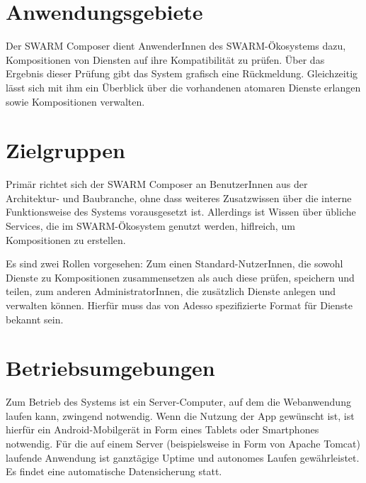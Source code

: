\section*{Anwendungsgebiete}
Der SWARM Composer dient AnwenderInnen des SWARM-Ökosystems dazu, Kompositionen von Diensten auf ihre Kompatibilität zu prüfen. Über das Ergebnis dieser Prüfung gibt das System grafisch eine Rückmeldung. Gleichzeitig lässt sich mit ihm ein Überblick über die vorhandenen atomaren Dienste erlangen sowie Kompositionen verwalten. 

\section*{Zielgruppen}

Primär richtet sich der SWARM Composer an BenutzerInnen aus der Architektur- und Baubranche, ohne dass weiteres Zusatzwissen über die interne Funktionsweise des Systems vorausgesetzt ist. Allerdings ist Wissen über übliche Services, die im SWARM-Ökosystem genutzt werden, hiflreich, um Kompositionen zu erstellen.

Es sind zwei Rollen vorgesehen: Zum einen Standard-NutzerInnen, die sowohl Dienste zu Kompositionen zusammensetzen als auch diese prüfen, speichern und teilen, zum anderen AdministratorInnen, die zusätzlich Dienste anlegen und verwalten können. Hierfür muss das von Adesso spezifizierte Format für Dienste bekannt sein.

\section*{Betriebsumgebungen}

Zum Betrieb des Systems ist ein Server-Computer, auf dem die Webanwendung laufen kann, zwingend notwendig. Wenn die Nutzung der App gewünscht ist, ist hierfür ein Android-Mobilgerät in Form eines Tablets oder Smartphones notwendig. Für die auf einem Server (beispielsweise in Form von Apache Tomcat) laufende Anwendung ist ganztägige Uptime und autonomes Laufen gewährleistet. Es findet eine automatische Datensicherung statt.




